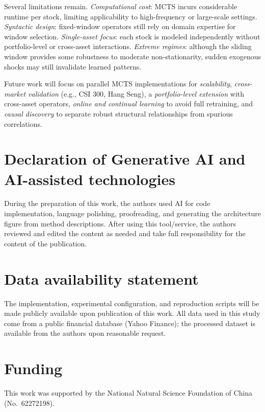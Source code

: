 \documentclass{elektr}
\theoremstyle{corollary}
\theoremstyle{lemma}
\theoremstyle{proposition}
\theoremstyle{axiom}
\theoremstyle{conjecture}
\theoremstyle{example}
\theoremstyle{definition}
\theoremstyle{remark}
\begin{document}
Several limitations remain. \textit{Computational cost}: MCTS incurs considerable runtime per stock, limiting applicability to high-frequency or large-scale settings. \textit{Syntactic design}: fixed-window operators still rely on domain expertise for window selection. \textit{Single-asset focus}: each stock is modeled independently without portfolio-level or cross-asset interactions. \textit{Extreme regimes}: although the sliding window provides some robustness to moderate non-stationarity, sudden exogenous shocks may still invalidate learned patterns.

Future work will focus on parallel MCTS implementations for \textit{scalability}, \textit{cross-market validation} (e.g., CSI 300, Hang Seng), a \textit{portfolio-level extension} with cross-asset operators, \textit{online and continual learning} to avoid full retraining, and \textit{causal discovery} to separate robust structural relationships from spurious correlations.



\section*{Declaration of Generative AI and AI-assisted technologies}
During the preparation of this work, the authors used AI for code implementation, language polishing, proofreading, and generating the architecture figure from method descriptions. After using this tool/service, the authors reviewed and edited the content as needed and take full responsibility for the content of the publication.

\section*{Data availability statement}
The implementation, experimental configuration, and reproduction scripts will be made publicly available upon publication of this work. All data used in this study come from a public financial database (Yahoo Finance); the processed dataset is available from the authors upon reasonable request.

\section*{Funding}
This work was supported by the National Natural Science Foundation of China (No.~62272198).
\end{document}
